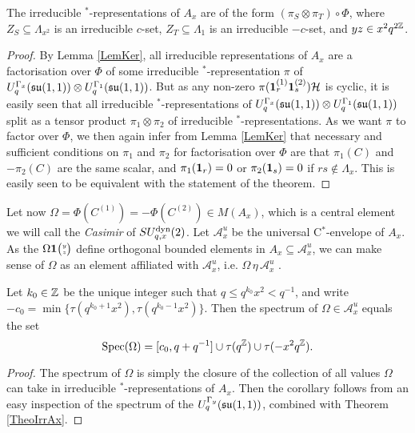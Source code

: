 \begin{Theorem}\label{TheoIrrAx} The irreducible $^*$-representations of $A_x$ are of the form $(\pi_S\otimes \pi_T)\circ \Phi$, where $Z_S \subseteq \Lambda_{x^2}$ is an irreducible $c$-set, $Z_T \subseteq \Lambda_1$ is an irreducible $-c$-set, and $yz \in x^2q^{2\mathbb{Z}}$. 
\end{Theorem}


\begin{proof} By Lemma \ref{LemKer}, all irreducible representations of $A_x$ are a factorisation over $\Phi$ of some irreducible $^*$-representation $\pi$ of $U_q^{\Gamma_x}(\mathfrak{su}(1,1))\otimes U_q^{\Gamma_1}(\mathfrak{su}(1,1))$. But as any non-zero $\pi(\mathbf{1}_r^{(1)}\mathbf{1}_s^{(2)})\mathcal{H}$ is cyclic, it is easily seen that all irreducible $^*$-representations of $U_q^{\Gamma_x}(\mathfrak{su}(1,1))\otimes U_q^{\Gamma_1}(\mathfrak{su}(1,1))$ split as a tensor product $\pi_1\otimes \pi_2$ of irreducible $^*$-representations. As we want $\pi$ to factor over $\Phi$, we then again infer from Lemma \ref{LemKer} that necessary and sufficient conditions on $\pi_1$ and $\pi_2$ for factorisation over $\Phi$ are that $\pi_1(C)$ and $-\pi_2(C)$ are the same scalar, and $\pi_1(\mathbf{1}_r)=0$ or $\pi_2(\mathbf{1}_s)=0$ if $rs\notin \Lambda_x$. This is easily seen to be equivalent with the statement of the theorem.
\end{proof}

Let now $\Omega = \Phi(C^{(1)}) = -\Phi(C^{(2)}) \in M(A_x)$, which is a central element we will call the \emph{Casimir} of $SU_{q,x}^{\operatorname{\mathrm{dyn}}}(2)$. Let $\mathcal{A}_x^u$ be the universal C$^*$-envelope of $A_x$. As the $\Omega\mathbf{1}{\tiny {\begin{pmatrix} y\\z\end{pmatrix}}}$ define orthogonal bounded elements in $A_x\subseteq \mathcal{A}_x^u$, we can make sense of $\Omega$ as an element affiliated with $\mathcal{A}_x^u$, i.e. $\Omega\,\eta\,\mathcal{A}_x^u$ \cite{Wor2}. 


\begin{Cor}\label{CorSpecUni} Let $k_0\in \mathbb{Z}$ be the unique integer such that $q\leq q^{k_0}x^2<q^{-1}$, and write $-c_{0} = \min \{\tau(q^{k_0+1}x^2),\tau(q^{k_0-1}x^{2})\}$. Then the spectrum of $\Omega \in \mathcal{A}_x^u$ equals the set \[\operatorname{\mathrm{Spec}}(\Omega) = \lbrack c_0,q+q^{-1}\rbrack \cup \tau(q^{\mathbb{Z}})\cup \tau (-x^2q^{\mathbb{Z}}).\]
\end{Cor}
\begin{proof} The spectrum of $\Omega$ is simply the closure of the collection of all values $\Omega$ can take in irreducible $^*$-representations of $A_x$. Then the corollary follows from an easy inspection of the spectrum of the $U_q^{\Gamma_y}(\mathfrak{su}(1,1))$, combined with Theorem \ref{TheoIrrAx}.

\end{proof} 

